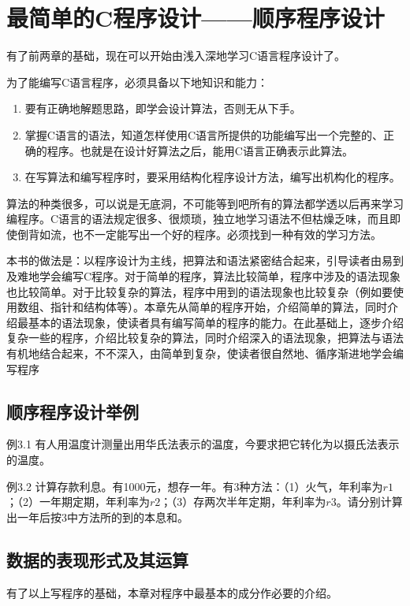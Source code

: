 \chapter{最简单的C程序设计——顺序程序设计}

有了前两章的基础，现在可以开始由浅入深地学习C语言程序设计了。

为了能编写C语言程序，必须具备以下地知识和能力：
\begin{enumerate}
	\item 要有正确地解题思路，即学会设计算法，否则无从下手。
	\item 掌握C语言的语法，知道怎样使用C语言所提供的功能编写出一个完整的、正确的程序。也就是在设计好算法之后，能用C语言正确表示此算法。
	\item 在写算法和编写程序时，要采用结构化程序设计方法，编写出机构化的程序。
\end{enumerate}
算法的种类很多，可以说是无底洞，不可能等到吧所有的算法都学透以后再来学习编程序。C语言的语法规定很多、很烦琐，独立地学习语法不但枯燥乏味，而且即使倒背如流，也不一定能写出一个好的程序。必须找到一种有效的学习方法。

本书的做法是：以程序设计为主线，把算法和语法紧密结合起来，引导读者由易到及难地学会编写C程序。对于简单的程序，算法比较简单，程序中涉及的语法现象也比较简单。对于比较复杂的算法，程序中用到的语法现象也比较复杂（例如要使用数组、指针和结构体等）。本章先从简单的程序开始，介绍简单的算法，同时介绍最基本的语法现象，使读者具有编写简单的程序的能力。在此基础上，逐步介绍复杂一些的程序，介绍比较复杂的算法，同时介绍深入的语法现象，把算法与语法有机地结合起来，不不深入，由简单到复杂，使读者很自然地、循序渐进地学会编写程序
\section{顺序程序设计举例}
例3.1 有人用温度计测量出用华氏法表示的温度，今要求把它转化为以摄氏法表示的温度。

例3.2 计算存款利息。有1000元，想存一年。有3种方法：（1）火气，年利率为$r1$；（2）一年期定期，年利率为$r2$；（3）存两次半年定期，年利率为$r3$。请分别计算出一年后按3中方法所的到的本息和。
\section{数据的表现形式及其运算}
有了以上写程序的基础，本章对程序中最基本的成分作必要的介绍。
